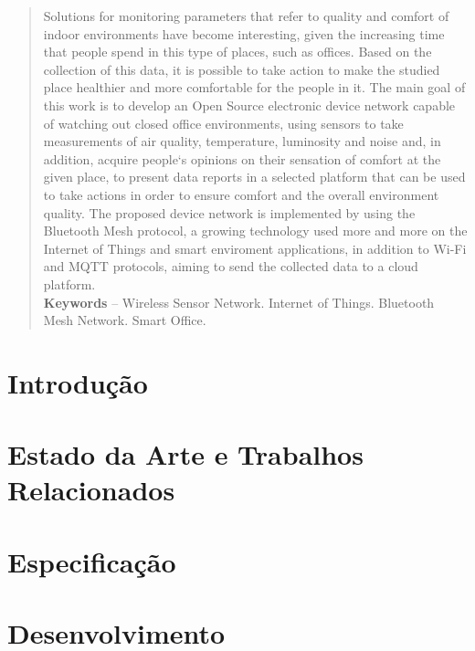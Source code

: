 \documentclass[]{politex}
\begin{document}
\begin{abstract}
Solutions for monitoring parameters that refer to quality and comfort of indoor environments have become interesting, given the increasing time that people spend in this type of places, such as offices. Based on the collection of this data, it is possible to take action to make the studied place healthier and more comfortable for the people in it. The main goal of this work is to develop an  Open Source electronic device network capable of watching out closed office environments, using sensors to take measurements of air quality, temperature, luminosity and noise and, in addition, acquire people`s opinions on their sensation of comfort at the given place, to present data reports in a selected platform that can be used to take actions in order to ensure comfort and the overall environment quality. The proposed device network is implemented by using the Bluetooth Mesh protocol, a growing technology used more and more on the Internet of Things and smart enviroment applications, in addition to Wi-Fi and MQTT protocols, aiming to send the collected data to a cloud platform.
%
\\[3\baselineskip]
%
\textbf{Keywords} -- Wireless Sensor Network. Internet of Things. Bluetooth Mesh Network. Smart Office.
\end{abstract}

\listadefiguras
\listadetabelas


\sumario


\chapter{Introdução} \label{cap:introducao}


\chapter{Estado da Arte e Trabalhos Relacionados} \label{cap:arte} %


\chapter{Especificação}


\chapter{Desenvolvimento}

\end{document}
